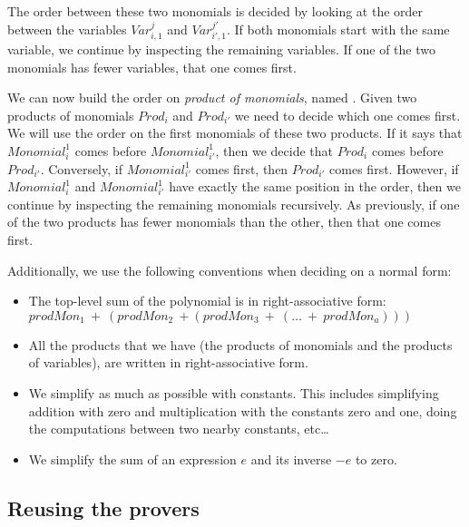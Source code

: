 The order between these two monomials is decided by looking at the order
between the variables $Var_{i,1}^{j}$ and $Var_{i',1}^{j'}$. 
If both monomials start with the same variable, we continue by inspecting
the remaining variables. If one of the two monomials
has fewer variables, that one comes first.

We can now build the order on \emph{product of monomials}, named
. Given two products of monomials $Prod_{i}$ and
$Prod_{i'}$ we need to decide which one comes first. 
We will use the
order  on the first monomials of these two products. If it
says that $Monomial_{i}^{1}$ comes before $Monomial_{i'}^{1}$, then we decide
that $Prod_{i}$ comes before $Prod_{i'}$. Conversely, if
$Monomial_{i'}^{1}$ comes first, then $Prod_{i'}$ comes
first. However, if $Monomial_{i}^{1}$ and $Monomial_{i'}^{1}$ have exactly the
same position in the order, then we continue by inspecting the remaining
monomials recursively. As previously, if 
one of the two products has fewer monomials than the other, then that one 
comes first.

Additionally, we use the following conventions when deciding on
a normal form:
\begin{itemize}

\item The top-level sum of the polynomial is in right-associative form: \\
$prodMon_1\ +\ (prodMon_2\ + (prodMon_3\ +\ (...\ +\ prodMon_a)))$
\item All the products that we have (the products of monomials and the products
of variables), are written in right-associative form.
\item We simplify as much as possible with constants. This includes
simplifying addition with zero and multiplication with the constants
zero and one, doing the computations between two nearby constants, etc\ldots
\item We simplify the sum of an expression $e$ and its inverse $-e$ to
zero. 

\end{itemize}

\subsection{Reusing the provers}
\label{sect:reusabilityOfTheProvers}

